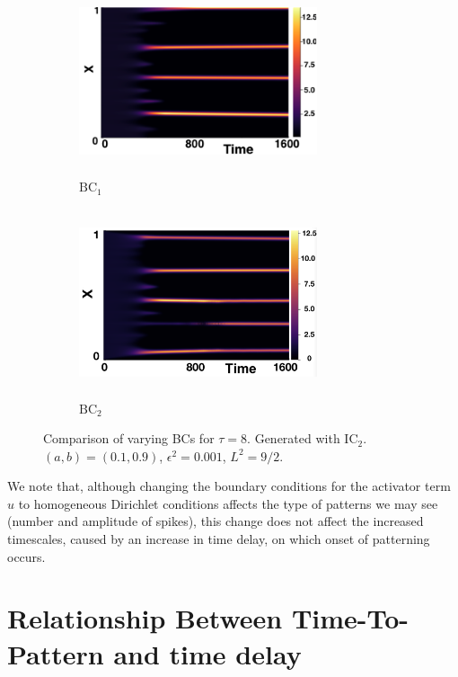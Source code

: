 \begin{figure}[H]
    \centering
    \begin{subfigure}[b]{0.45\textwidth}
        \centering
        \includegraphics[width=7cm,height=5.5cm]{ic28.png}
        \caption{$\text{BC}_1$}
        \label{}
    \end{subfigure}
    \hfill
    \begin{subfigure}[b]{0.45\textwidth}
        \centering
        \includegraphics[width=7cm,height=5.5cm]{bc8.png}
        \caption{$\text{BC}_2$}
        \label{}
    \end{subfigure}
    \caption{Comparison of varying BCs for $\tau=8$. Generated with $\text{IC}_2$. $(a,b)=(0.1,0.9)$, $\epsilon^2=0.001$, $L^2=9/2$.}
    \label{fig:bctau3}
\end{figure}

We note that, although changing the boundary conditions for the activator term $u$ to homogeneous Dirichlet conditions affects the type of patterns we may see (number and amplitude of spikes), this change does not affect the increased timescales, caused by an increase in time delay, on which onset of patterning occurs.

\section{Relationship Between Time-To-Pattern and time delay}\label{section:delaypatt}

